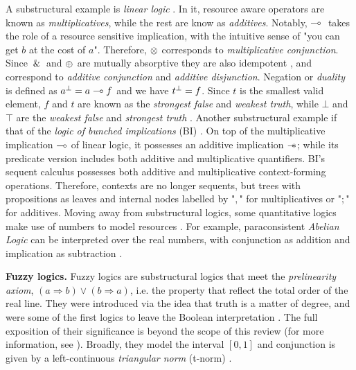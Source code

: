 A substructural example is \textit{linear logic} \citep{galatos2007residuated}. In it, resource aware operators are known as \textit{multiplicatives}, while the rest are know as \textit{additives}. Notably, $\multimap{}$ takes the role of a resource sensitive implication, with the intuitive sense of "you can get $b$ at the cost of $a$". Therefore, $\otimes{}$ corresponds to \textit{multiplicative conjunction}.
Since $\,\&^{}\,$ and $\oplus^{}$ are mutually absorptive they are also idempotent \citep{galatos2007residuated}, and correspond to \textit{additive conjunction} and \textit{additive disjunction}. Negation or \textit{duality} is defined as $a ^\bot = a \multimap{} f$ and we have $t ^\bot = f$. Since $t$ is the smallest valid element, $f$ and $t$ are known as the \textit{strongest false} and \textit{weakest truth}, while $\bot$ and $\top$ are the \textit{weakest false} and \textit{strongest truth} \citep{galatos2007residuated}. Another substructural example if that of the \textit{logic of bunched implications} (BI) \citep{o1999logic}. On top of the multiplicative implication $\multimap$ of linear logic, it possesses an additive implication $\mathrel{-\mkern-6mu*}$; while its predicate version includes both additive and multiplicative quantifiers. BI's sequent calculus possesses both additive and multiplicative context-forming operations. Therefore, contexts are no longer sequents, but trees with propositions as leaves and internal nodes labelled by "$,$" for multiplicatives or "$;$" for additives. Moving away from substructural logics, some quantitative logics make use of numbers to model resources \citep{meyer1980abelian, shortliffe2012computer}. For example, paraconsistent \textit{Abelian Logic} can be interpreted over the real numbers, with conjunction as addition and implication as subtraction \citep{meyer1980abelian}. 

\textbf{Fuzzy logics.} Fuzzy logics are substructural logics that meet the \textit{prelinearity axiom}, $(a \Rightarrow b) \lor (b \Rightarrow a)$, i.e. the property that reflect the total order of the real line. They were introduced via the idea that truth is a matter of degree, and were some of the first logics to leave the Boolean interpretation \citep{galatos2007residuated}. The full exposition of their significance is beyond the scope of this review (for more information, see \cite{cintula2011handbook, prooffuzzy}). Broadly, they model the interval $[0,1]$ and conjunction is given by a left-continuous \emph{triangular norm} (t-norm) \citep{cintula2011handbook,prooffuzzy}.

